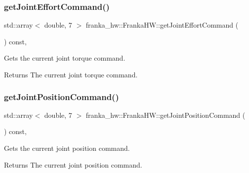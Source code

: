 \subsubsection{\texorpdfstring{get\+Joint\+Effort\+Command()}{getJointEffortCommand()}}
{\footnotesize\ttfamily std\+::array$<$ double, 7 $>$ franka\+\_\+hw\+::\+Franka\+H\+W\+::get\+Joint\+Effort\+Command (\begin{DoxyParamCaption}{ }\end{DoxyParamCaption}) const\hspace{0.3cm}{\ttfamily [virtual]}, {\ttfamily [noexcept]}}

Gets the current joint torque command.

\begin{DoxyReturn}{Returns}
The current joint torque command. 
\end{DoxyReturn}
\mbox{\label{classfranka__hw_1_1_franka_h_w_a80bc3da19575532ab827bc9c62f91bed}} 
\subsubsection{\texorpdfstring{get\+Joint\+Position\+Command()}{getJointPositionCommand()}}
{\footnotesize\ttfamily std\+::array$<$ double, 7 $>$ franka\+\_\+hw\+::\+Franka\+H\+W\+::get\+Joint\+Position\+Command (\begin{DoxyParamCaption}{ }\end{DoxyParamCaption}) const\hspace{0.3cm}{\ttfamily [virtual]}, {\ttfamily [noexcept]}}

Gets the current joint position command.

\begin{DoxyReturn}{Returns}
The current joint position command. 
\end{DoxyReturn}
\mbox{\label{classfranka__hw_1_1_franka_h_w_a93067ec2c8ba530188ee70f024ddf100}} 
